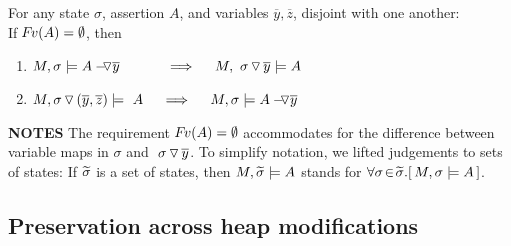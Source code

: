 \begin{lemma} 
\label{lemma:push:ass:state}
For any state  $\sigma$, assertion $A$, and variables   $\overline y, \overline z$, disjoint with one another:
\\
If  ${\hspace{-1pt}F\hspace{-1pt}}v(A)=\emptyset$, then
\begin{enumerate}
 \item
 \label{lemma:push:ass:state:one}
$M, \sigma \models \PushAS {y} {A}\ \ \ \ \ \ \  \ \ \    \Longrightarrow  \ \ \ \ M,  \PushS {y} {\sigma}   \models A$
\item
\label{lemma:push:ass:state:two}
$M, { \PushSLong {(\overline y, \overline z)} {\sigma} } \models\  A \  \ \ \ \Longrightarrow  \ \ \ \ M,  \sigma \models  \PushAS  {y} {A}$
\end{enumerate}
\end{lemma}



\noindent
\textbf{NOTES} \notesep 
{The requirement   ${\hspace{-1pt}F\hspace{-1pt}}v(A)=\emptyset$   accommodates for the difference between variable maps in $\sigma$ and  $ \ {\sigma} \, {\triangledown}\, \overline{y} $.}
 \notesep 
To simplify notation,  we lifted %
judgements to sets of states: If  $\widetilde \sigma$ is a set of states,  then
$M,   \widetilde \sigma \models A$ stands for  $\forall\sigma\! \in\! \widetilde \sigma.[\, M,\sigma \models A \, ]$.    


\subsection{Preservation across heap modifications}

